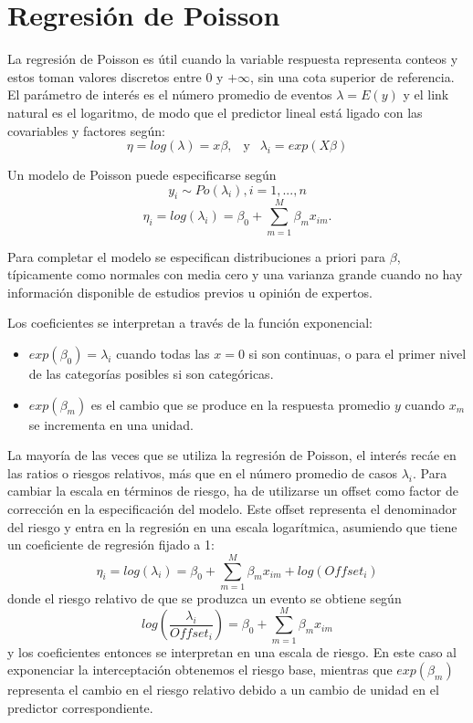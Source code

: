 \documentclass[
]{book}
\providecommand{\tightlist}{%
  \setlength{\itemsep}{0pt}\setlength{\parskip}{0pt}}
\begin{document}
\hypertarget{regresiuxf3n-de-poisson}{%
\section{Regresión de Poisson}\label{regresiuxf3n-de-poisson}}

La regresión de Poisson es útil cuando la variable respuesta representa conteos y estos toman valores discretos entre 0 y \(+\infty\), sin una cota superior de referencia. El parámetro de interés es el número promedio de eventos \(\lambda=E(y)\) y el link natural es el logaritmo, de modo que el predictor lineal está ligado con las covariables y factores según:
\[\eta=log(\lambda)=x \beta, \ \ \mbox{ y } \ \ \lambda_i=exp(X \beta)\]

Un modelo de Poisson puede especificarse según
\[y_i \sim Po(\lambda_i), i=1,...,n\]
\[\eta_i=log(\lambda_i)=\beta_0+\sum_{m=1}^M \beta_mx_{im}.\]

Para completar el modelo se especifican distribuciones a priori para \(\beta\), típicamente como normales con media cero y una varianza grande cuando no hay información disponible de estudios previos u opinión de expertos.

Los coeficientes se interpretan a través de la función exponencial:

\begin{itemize}
\tightlist
\item
  \(exp(\beta_0)=\lambda_i\) cuando todas las \(x=0\) si son continuas, o para el primer nivel de las categorías posibles si son categóricas.
\item
  \(exp(\beta_m)\) es el cambio que se produce en la respuesta promedio \(y\) cuando \(x_m\) se incrementa en una unidad.
\end{itemize}

La mayoría de las veces que se utiliza la regresión de Poisson, el interés recáe en las ratios o riesgos relativos, más que en el número promedio de casos \(\lambda_i\). Para cambiar la escala en términos de riesgo, ha de utilizarse un offset como factor de corrección en la especificación del modelo. Este offset representa el denominador del riesgo y entra en la regresión en una escala logarítmica, asumiendo que tiene un coeficiente de regresión fijado a 1:
\[\eta_i=log(\lambda_i)=\beta_0+\sum_{m=1}^M \beta_mx_{im}+log(Offset_i)\]
donde el riesgo relativo de que se produzca un evento se obtiene según
\[log\left(\frac{\lambda_i}{Offset_i}\right)=\beta_0+\sum_{m=1}^M \beta_mx_{im}\]
y los coeficientes entonces se interpretan en una escala de riesgo. En este caso al exponenciar la interceptación obtenemos el riesgo base, mientras que \(exp(\beta_m)\) representa el cambio en el riesgo relativo debido a un cambio de unidad en el predictor correspondiente.
\end{document}
